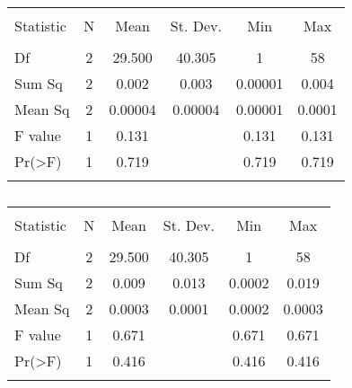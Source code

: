 \begin{table}[!htbp] \centering 
  \caption{} 
  \label{} 
\begin{tabular}{@{\extracolsep{5pt}}lccccc} 
\\[-1.8ex]\hline 
\hline \\[-1.8ex] 
Statistic & \multicolumn{1}{c}{N} & \multicolumn{1}{c}{Mean} & \multicolumn{1}{c}{St. Dev.} & \multicolumn{1}{c}{Min} & \multicolumn{1}{c}{Max} \\ 
\hline \\[-1.8ex] 
Df & 2 & 29.500 & 40.305 & 1 & 58 \\ 
Sum Sq & 2 & 0.002 & 0.003 & 0.00001 & 0.004 \\ 
Mean Sq & 2 & 0.00004 & 0.00004 & 0.00001 & 0.0001 \\ 
F value & 1 & 0.131 &  & 0.131 & 0.131 \\ 
Pr(\textgreater F) & 1 & 0.719 &  & 0.719 & 0.719 \\ 
\hline \\[-1.8ex] 
\end{tabular} 
\end{table} 

\begin{table}[!htbp] \centering 
  \caption{} 
  \label{} 
\begin{tabular}{@{\extracolsep{5pt}}lccccc} 
\\[-1.8ex]\hline 
\hline \\[-1.8ex] 
Statistic & \multicolumn{1}{c}{N} & \multicolumn{1}{c}{Mean} & \multicolumn{1}{c}{St. Dev.} & \multicolumn{1}{c}{Min} & \multicolumn{1}{c}{Max} \\ 
\hline \\[-1.8ex] 
Df & 2 & 29.500 & 40.305 & 1 & 58 \\ 
Sum Sq & 2 & 0.009 & 0.013 & 0.0002 & 0.019 \\ 
Mean Sq & 2 & 0.0003 & 0.0001 & 0.0002 & 0.0003 \\ 
F value & 1 & 0.671 &  & 0.671 & 0.671 \\ 
Pr(\textgreater F) & 1 & 0.416 &  & 0.416 & 0.416 \\ 
\hline \\[-1.8ex] 
\end{tabular} 
\end{table} 

